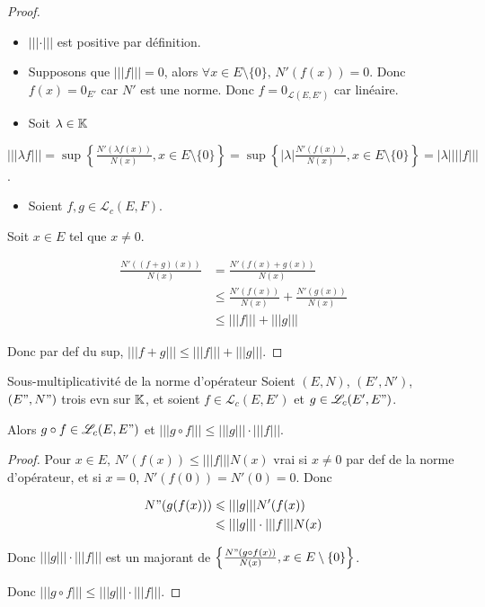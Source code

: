 \begin{proof}
    \begin{itemize}
        \item $|||\cdot|||$ est positive par définition.
        \item Supposons que $|||f||| = 0$, alors $\forall x \in E \setminus \{0\}, \, N'(f(x)) = 0$.
            Donc $f(x) = 0_{E'}$ car $N'$ est une norme. Donc $f = 0_{\mathscr L(E, E')}$ car linéaire. 
        \item Soit $\lambda \in \mathbb{K}$
    \end{itemize}

    $|||\lambda f||| = \sup \left\{ \frac{N'(\lambda f(x))}{N(x)}, x \in E \setminus \{0\} \right\} = \sup \left\{ |\lambda| \frac{N'(f(x))}{N(x)}, x \in E \setminus \{0\} \right\} = |\lambda| |||f|||$.

    \begin{itemize}
        \item Soient $f, g \in \mathscr L_c(E, F)$.
    \end{itemize}

    Soit $x \in E$ tel que $x \neq 0$.

    \begin{align*}
         \frac{N'((f + g)(x))}{N(x)} & = \frac{N'(f(x) + g(x))}{N(x)} \\
            & \leqslant \frac{N'(f(x)) }{N(x)} + \frac{N'(g(x))}{N(x)} \\
            & \leqslant |||f||| + |||g|||
    \end{align*}

    Donc par def du sup, $|||f + g||| \leqslant |||f||| + |||g|||$.
\end{proof}


\begin{proposition}{Sous-multiplicativité de la norme d'opérateur }{}
    Soient $(E, N)$, $(E', N')$, $(E", N")$ trois evn sur $\mathbb{K}$, et soient $f \in \mathscr L_c(E, E')$ et $g \in \mathscr L_c(E', E")$.

    Alors $g \circ f \in \mathscr L_c(E, E")$ et $|||g \circ f||| \leqslant |||g||| \cdot |||f|||$.
\end{proposition}

\begin{proof}
    Pour $x \in E, \, N'(f(x)) \leqslant |||f||| N(x)$ vrai si $x \neq 0$ par def 
    de la norme d'opérateur, et si $x = 0$, $N'(f(0)) = N'(0) = 0$.
    Donc  

    \begin{align*}
        N"(g(f(x))) & \leqslant |||g||| N'(f(x)) \\
        & \leqslant |||g||| \cdot |||f||| N(x)
    \end{align*}

    Donc $|||g||| \cdot |||f|||$ est un majorant de $\left\{ \frac{N"(g\circ f(x))}{N(x)}, x \in E \setminus \{0\} \right\}$.

    Donc $|||g \circ f||| \leqslant |||g||| \cdot |||f|||$.
\end{proof}

